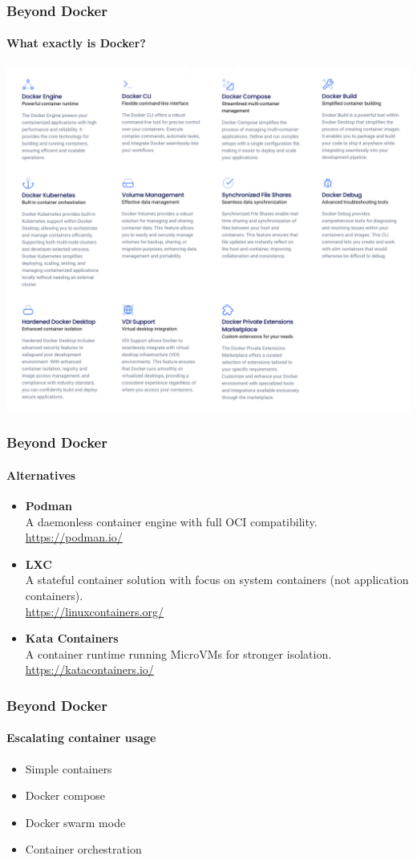 \begin{frame}
    \frametitle{Beyond Docker}
    \framesubtitle{What exactly is Docker?}
    \centering \includegraphics[height=0.8\textheight]{images/docker_products}
\end{frame}

\begin{frame}
    \frametitle{Beyond Docker}
    \framesubtitle{Alternatives}
    \begin{itemize}
        \item \textbf{Podman}\\
        A daemonless container engine with full OCI compatibility.\\
        \url{https://podman.io/}\newline
        \item \textbf{LXC}\\
        A stateful container solution with focus on system containers (not application containers).\\
        \url{https://linuxcontainers.org/}\newline
        \item \textbf{Kata Containers}\\
        A container runtime running MicroVMs for stronger isolation.\\
        \url{https://katacontainers.io/}
    \end{itemize}
\end{frame}

\begin{frame}
    \frametitle{Beyond Docker}
    \framesubtitle{Escalating container usage}
    \begin{itemize}
        \item Simple containers\newline
        \item Docker compose\newline
        \item Docker swarm mode\newline
        \item Container orchestration\newline
    \end{itemize}
\end{frame}
